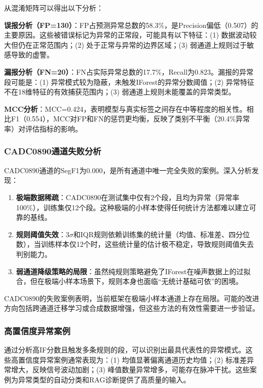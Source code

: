\documentclass[12pt, a4paper]{article}
\begin{document}
从混淆矩阵可以得出以下分析：

\textbf{误报分析（FP=130）}：FP占预测异常总数的58.3\%，是Precision偏低（0.507）的主要原因。这些被错误标记为异常的正常段，可能具有以下特征：(1) 数据波动较大但仍在正常范围内；(2) 处于正常与异常的边界区域；(3) 弱通道上规则过于敏感导致的虚警。

\textbf{漏报分析（FN=20）}：FN占实际异常总数的17.7\%，Recall为0.823。漏报的异常段可能是：(1) 异常模式较为隐蔽，未触发IForest的异常分数阈值；(2) 异常特征不在18维特征的有效捕获范围内；(3) 弱通道上规则未能覆盖的异常类型。

\textbf{MCC分析}：MCC=0.424，表明模型与真实标签之间存在中等程度的相关性。相比F1（0.554），MCC对FP和FN的惩罚更均衡，反映了类别不平衡（20.4\%异常率）对评估指标的影响。

\subsubsection{CADC0890通道失败分析}

CADC0890通道的SegF1为0.000，是所有通道中唯一完全失败的案例。深入分析发现：

\begin{enumerate}[label=(\arabic*)]
    \item \textbf{极端数据稀疏}：CADC0890在测试集中仅有2个段，且均为异常（异常率100\%），训练集仅12个段。这种极端的小样本使得任何统计方法都难以建立可靠的基线。
    \item \textbf{规则阈值失效}：3$\sigma$和IQR规则依赖训练集的统计量（均值、标准差、四分位数），当训练样本仅12个时，这些统计量的估计极不稳定，导致规则阈值失去判别能力。
    \item \textbf{弱通道降级策略的局限}：虽然纯规则策略避免了IForest在噪声数据上的过拟合，但在极端小样本场景下，规则本身也面临``无统计基础可依''的困境。
\end{enumerate}

CADC0890的失败案例表明，当前框架在极端小样本通道上存在局限。可能的改进方向包括跨通道迁移学习或合成数据增强，但这些方法的有效性需要进一步验证。

\subsubsection{高置信度异常案例}

通过分析高IF分数且触发多条规则的段，可以识别出最具代表性的异常模式。这些高置信度异常案例通常表现为：(1) 均值显著偏离通道历史均值；(2) 标准差异常增大，反映信号波动加剧；(3) 峰值数量异常增多，可能存在脉冲干扰。这些案例为异常类型的自动分类和RAG诊断提供了高质量的输入。
\end{document}
